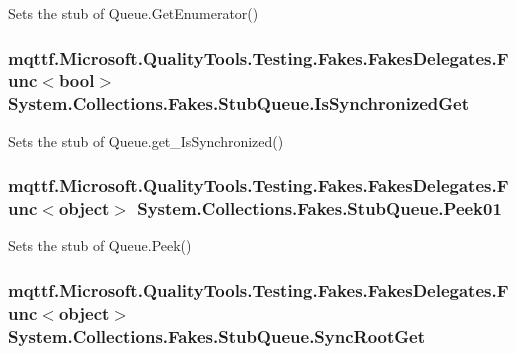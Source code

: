 Sets the stub of Queue.\-Get\-Enumerator()

\hypertarget{class_system_1_1_collections_1_1_fakes_1_1_stub_queue_a00f603b2d312dad9235a4fe5fc4f3c73}{
\subsubsection[{Is\-Synchronized\-Get}]{\setlength{\rightskip}{0pt plus 5cm}mqttf.\-Microsoft.\-Quality\-Tools.\-Testing.\-Fakes.\-Fakes\-Delegates.\-Func$<$bool$>$ System.\-Collections.\-Fakes.\-Stub\-Queue.\-Is\-Synchronized\-Get}}\label{class_system_1_1_collections_1_1_fakes_1_1_stub_queue_a00f603b2d312dad9235a4fe5fc4f3c73}


Sets the stub of Queue.\-get\-\_\-\-Is\-Synchronized()

\hypertarget{class_system_1_1_collections_1_1_fakes_1_1_stub_queue_a2abe13aa02d8bba50dcee768e96df100}{
\subsubsection[{Peek01}]{\setlength{\rightskip}{0pt plus 5cm}mqttf.\-Microsoft.\-Quality\-Tools.\-Testing.\-Fakes.\-Fakes\-Delegates.\-Func$<$object$>$ System.\-Collections.\-Fakes.\-Stub\-Queue.\-Peek01}}\label{class_system_1_1_collections_1_1_fakes_1_1_stub_queue_a2abe13aa02d8bba50dcee768e96df100}


Sets the stub of Queue.\-Peek()

\hypertarget{class_system_1_1_collections_1_1_fakes_1_1_stub_queue_ac27f830b8b245b67771a53301542ed43}{
\subsubsection[{Sync\-Root\-Get}]{\setlength{\rightskip}{0pt plus 5cm}mqttf.\-Microsoft.\-Quality\-Tools.\-Testing.\-Fakes.\-Fakes\-Delegates.\-Func$<$object$>$ System.\-Collections.\-Fakes.\-Stub\-Queue.\-Sync\-Root\-Get}}\label{class_system_1_1_collections_1_1_fakes_1_1_stub_queue_ac27f830b8b245b67771a53301542ed43}



